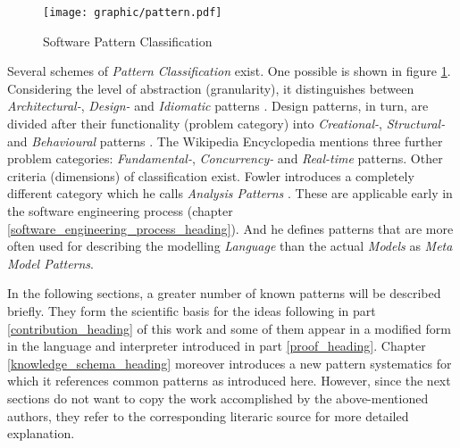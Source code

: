 \begin{figure}[ht]
    \begin{center}
        \texttt{[image: graphic/pattern.pdf]}
        \caption{Software Pattern Classification}
        \label{pattern_figure}
    \end{center}
\end{figure}

Several schemes of \emph{Pattern Classification} exist. One possible is shown in
figure \ref{pattern_figure}. Considering the level of abstraction (granularity),
it distinguishes between \emph{Architectural-}, \emph{Design-} and \emph{Idiomatic}
patterns \cite{buschmann}. Design patterns, in turn, are divided after their
functionality (problem category) into \emph{Creational-}, \emph{Structural-}
and \emph{Behavioural} patterns \cite{gamma1995}. The Wikipedia Encyclopedia
\cite{wikipedia} mentions three further problem categories: \emph{Fundamental-},
\emph{Concurrency-} and \emph{Real-time} patterns. Other criteria (dimensions) of
classification exist. Fowler introduces a completely different category which he
calls \emph{Analysis Patterns} \cite{fowler1997}. These are applicable early in the
software engineering process (chapter \ref{software_engineering_process_heading}).
And he defines patterns that are more often used for describing the modelling
\emph{Language} than the actual \emph{Models} as \emph{Meta Model Patterns}.

In the following sections, a greater number of known patterns will be described
briefly. They form the scientific basis for the ideas following in part
\ref{contribution_heading} of this work and some of them appear in a modified
form in the language and interpreter introduced in part \ref{proof_heading}.
Chapter \ref{knowledge_schema_heading} moreover introduces a new pattern
systematics for which it references common patterns as introduced here.
However, since the next sections do not want to copy the work accomplished by
the above-mentioned authors, they refer to the corresponding literaric source
for more detailed explanation.





